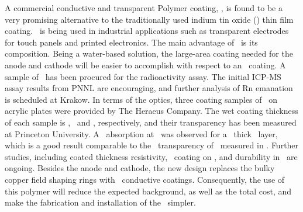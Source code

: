 A commercial conductive and transparent Polymer coating, \Clevios, is found to be a very promising alternative to the traditionally used indium tin oxide (\ITO) thin film coating. \Clevios\ is being used in industrial applications such as transparent electrodes for touch panels and printed electronics. The main advantage of \Clevios\ is its composition.  Being a water-based solution, the large-area coating needed for the anode and cathode will be easier to accomplish with respect to an \ITO\ coating.  A sample of \CleviosFirstTestSampleMass\ has been procured for the radioactivity assay. The initial ICP-MS assay results from PNNL are encouraging, and further analysis of Rn emanation is scheduled at Krakow. In terms of the optics, three coating samples of \Clevios\ on acrylic plates were provided by The Heraeus Company. The wet coating thickness of each sample is \CleviosSampleThicknessFour, \CleviosSampleThicknessEight\ and \CleviosSampleThicknessTwelve, respectively, and their transparency has been measured at Princeton University. A \CleviosTestAbsorptionFour\ absorption at \DSfPMTWaveLength\ was observed for a \CleviosSampleThicknessFour\ thick \Clevios\ layer, which is a good result comparable to the \DSkITOTransparency\ transparency of \ITO\ measured in \DSfs. Further studies, including coated thickness resistivity, \TPB\ coating on \Clevios, and durability in \LAr\ are ongoing. Besides the anode and cathode, the new design replaces the bulky copper field shaping rings with \Clevios\ conductive coatings. Consequently, the use of this polymer will reduce the expected background, as well as the total cost, and make the fabrication and installation of the \TPC\ simpler. 

